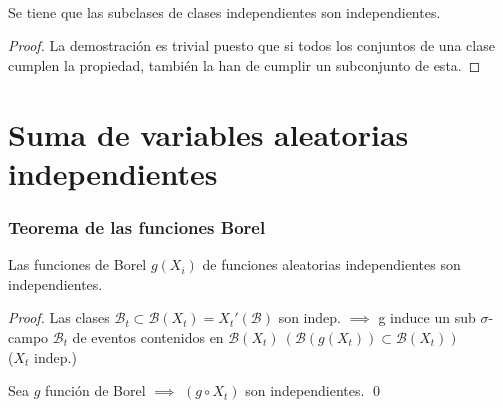 \begin{theorem}
  \
  
Se tiene que las subclases de clases independientes son independientes.
\end{theorem}

\begin{proof}
	La demostración es trivial puesto que si todos los conjuntos de una clase cumplen la propiedad, también la han de cumplir un subconjunto de esta.
\end{proof}

\section{Suma de variables aleatorias independientes}
\subsubsection{Teorema de las funciones Borel}
\begin{theorem}
Las funciones de Borel $g(X_i)$ de funciones aleatorias independientes son independientes.
\end{theorem}


\begin{proof}
Las clases $\mathcal{B}_t\subset \mathcal{B}(X_t) = X_t'(\mathcal{B})$ son indep. $\implies$ g induce un sub $\sigma$-campo $\mathcal{B}_t$ de eventos contenidos en $\mathcal{B}(X_t) \ (\mathcal{B}(g(X_t)) \subset \mathcal{B}(X_t))$
\\


($X_t$ indep.)

Sea $g$ función de Borel $\implies$ $(g \circ X_t)$ son independientes.
\qed
\end{proof}

